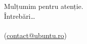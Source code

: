 \documentclass[compress]{beamer}
\begin{document}
\begin{frame}
  \begin{center}
    \huge
    Mulțumim pentru atenție.
    \\
    Întrebări\ldots
    \\
    \\
    (\href{mailto://contact@ubuntu.ro}{contact@ubuntu.ro})
  \end{center}
\end{frame}
\end{document}
